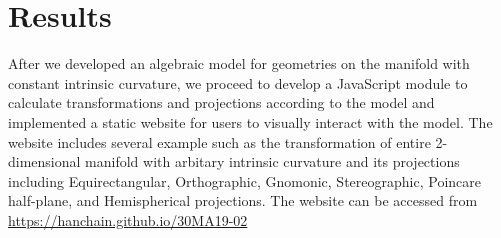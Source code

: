 \documentclass[../main.tex]{subfiles}
\begin{document}
\section{Results}
After we developed an algebraic model for geometries on the manifold with constant intrinsic curvature,
we proceed to develop a JavaScript module to calculate transformations and projections according to the model
and implemented a static website for users to visually interact with the model.
The website includes several example such as
the transformation of entire 2-dimensional manifold
with arbitary intrinsic curvature
and its projections including
Equirectangular, Orthographic, Gnomonic, Stereographic, Poincare half-plane, and Hemispherical projections.
The website can be accessed from
\url{https://hanchain.github.io/30MA19-02}
\end{document}
